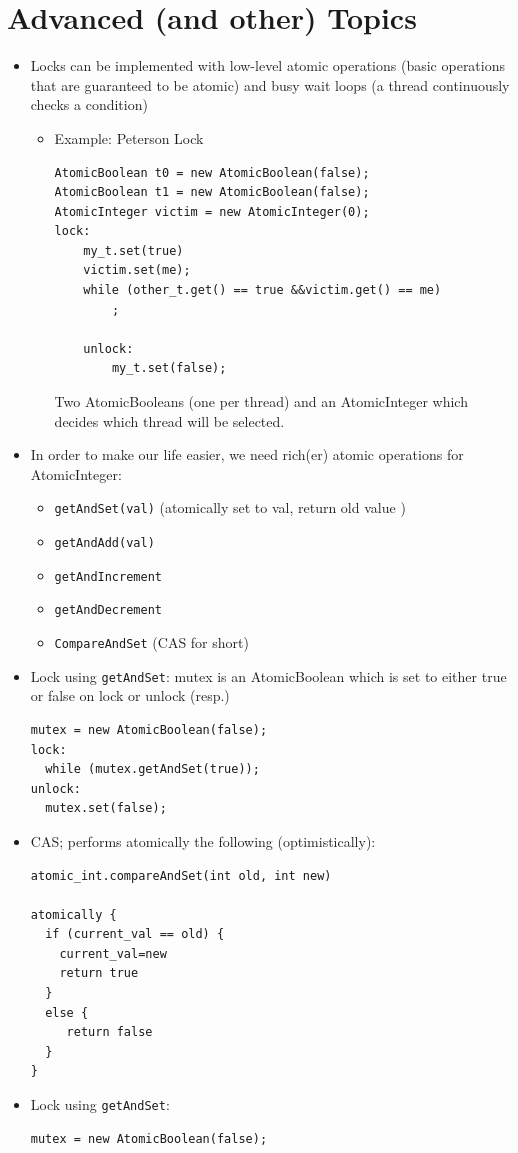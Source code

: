 \documentclass[a4paper]{article}
\newcommand{\inline}[1]{\lstinline!#1!}%
\begin{document}
\section{Advanced (and other) Topics}
\begin{itemize}
\item Locks can be implemented with low-level atomic operations (basic operations that are guaranteed to be atomic) and busy wait loops (a thread continuously checks a condition)
\begin{itemize}
\item Example: Peterson Lock
\begin{lstlisting}
AtomicBoolean t0 = new AtomicBoolean(false);
AtomicBoolean t1 = new AtomicBoolean(false);
AtomicInteger victim = new AtomicInteger(0);
lock:
    my_t.set(true)
    victim.set(me);
    while (other_t.get() == true &&victim.get() == me)
        ;
	
	unlock:
        my_t.set(false);
\end{lstlisting}
Two AtomicBooleans (one per thread) and an AtomicInteger which decides which thread will be selected.
\end{itemize}
\item In order to make our life easier, we need rich(er) atomic operations for AtomicInteger: 
\begin{itemize}
\item \inline{getAndSet(val)} (atomically { set to val, return old value })
\item \inline{getAndAdd(val)}
\item \inline{getAndIncrement}
\item \inline{getAndDecrement}
\item \inline{CompareAndSet} (CAS for short)
\end{itemize}
\item Lock using \inline{getAndSet}: mutex is an AtomicBoolean which is set to either true or false on lock or unlock (resp.)
\begin{lstlisting}
mutex = new AtomicBoolean(false);
lock:
  while (mutex.getAndSet(true));
unlock:
  mutex.set(false);
\end{lstlisting}
\item CAS; performs atomically the following (optimistically): 
\begin{lstlisting}
atomic_int.compareAndSet(int old, int new)

atomically {
  if (current_val == old) {
    current_val=new
    return true
  }
  else {
     return false
  }
}
\end{lstlisting}
\item Lock using \inline{getAndSet}: 
\begin{lstlisting}
mutex = new AtomicBoolean(false);


\end{lstlisting}
\end{itemize}
\end{document}
